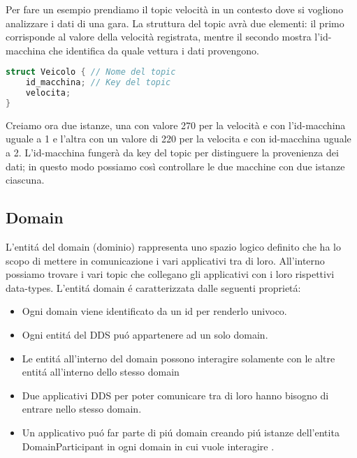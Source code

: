 Per fare un esempio prendiamo il topic velocità in un contesto dove si
vogliono analizzare i dati di una gara.
La struttura del topic avrà due elementi: il primo corrisponde al valore
della velocità registrata, mentre il secondo mostra l'id-macchina 
che identifica da quale vettura i dati provengono.

\vspace{5mm} %
\begin{lstlisting}[language=C++, caption=Esempio di Topic con una key
    usando il linguaggio IDL.
    , label=Topic struct,
    captionpos=b]
struct Veicolo { // Nome del topic
    id_macchina; // Key del topic
    velocita;
}
\end{lstlisting}
\vspace{5mm}

Creiamo ora due istanze, una con valore 270 per la velocità e con 
l'id-macchina uguale a 1 e l'altra con un valore di 220 per la velocita e 
con id-macchina 
uguale a 2. L'id-macchina fungerà da key 
del topic per distinguere la provenienza dei dati; in questo
modo possiamo così controllare le due macchine con due istanze ciascuna.



\subsection{Domain}
L'entitá del domain (dominio) rappresenta uno spazio logico definito che
ha lo scopo di mettere in comunicazione i vari applicativi tra di loro.
All'interno possiamo trovare i vari topic che collegano gli applicativi
con i loro rispettivi data-types.
L'entitá domain é caratterizzata dalle seguenti proprietá:
\begin{itemize}
    \item Ogni domain viene identificato da un id 
    per renderlo univoco.
    \item Ogni entitá del DDS puó appartenere
    ad un solo domain.
    \item Le entitá all'interno del domain possono interagire
    solamente con le altre entitá all'interno dello stesso domain
    \item Due applicativi DDS per poter comunicare tra di loro
    hanno bisogno di entrare nello stesso domain.
    \item Un applicativo puó far parte di piú domain creando 
    piú istanze dell'entita DomainParticipant in ogni
    domain in cui vuole interagire \cite{domainrti}.
\end{itemize}

